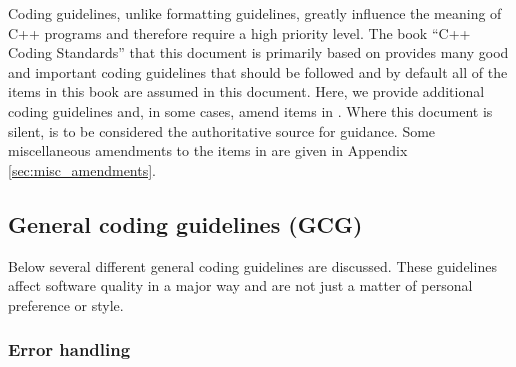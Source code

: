 Coding guidelines, unlike formatting guidelines, greatly influence the meaning
of C++ programs and therefore require a high priority level.  The book ``C++
Coding Standards'' {}\cite{C++CodingStandards05} that this document is
primarily based on provides many good and important coding guidelines that
should be followed and by default all of the items in this book are assumed in
this document.  Here, we provide additional coding guidelines and, in some
cases, amend items in {}\cite{C++CodingStandards05}.  Where this document is
silent, {}\cite{C++CodingStandards05} is to be considered the authoritative
source for guidance.  Some miscellaneous amendments to the items in
{}\cite{C++CodingStandards05} are given in Appendix
{}\ref{sec:misc_amendments}.


%
\subsection{General coding guidelines (GCG)}
%

Below several different general coding guidelines are discussed.  These
guidelines affect software quality in a major way and are not just a matter of
personal preference or style.

%
\subsubsection{Error handling}
%

